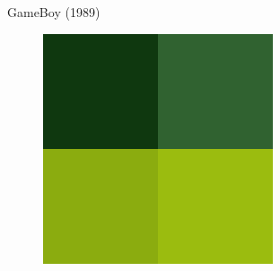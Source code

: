 \documentclass{beamer}
\begin{document}
\begin{darkframes}
\begin{frame}{GameBoy (1989)}
\begin{multicols}{2}
\begin{figure}[h!]
        \end{figure}
        \begin{figure}[h!]
            \centering
            \includegraphics[height=.2\textheight]{gb_palette}
        \end{figure}
    \end{multicols}
\end{frame}


\end{darkframes}
\end{document}
